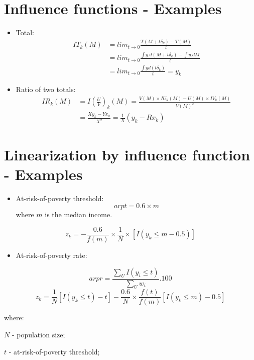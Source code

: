 \documentclass[]{book}
\providecommand{\tightlist}{%
  \setlength{\itemsep}{0pt}\setlength{\parskip}{0pt}}
\begin{document}
\section{Influence functions -
Examples}\label{influence-functions---examples}

\begin{itemize}
\item
  Total: \[
  \begin{aligned}
  IT_k(M)&=lim_{t\rightarrow 0}\frac{T(M+t\delta_k)-T(M)}{t}\\
  &=lim_{t\rightarrow 0}\frac{\int y.d(M+t\delta_k)-\int y.dM}{t}\\
  &=lim_{t\rightarrow 0}\frac{\int yd(t\delta_k)}{t}=y_k  
  \end{aligned}
  \]
\item
  Ratio of two totals: \[
  \begin{aligned}
  IR_k(M)&=I\left(\frac{U}{V}\right)_k(M)=\frac{V(M)\times IU_k(M)-U(M)\times IV_k(M)}{V(M)^2}\\
  &=\frac{X y_k-Y x_k}{X^2}=\frac{1}{X}(y_k-Rx_k)
  \end{aligned}
  \]
\end{itemize}

\section{Linearization by influence function -
Examples}\label{linearization-by-influence-function---examples}

\begin{itemize}
\tightlist
\item
  At-risk-of-poverty threshold: \[
  arpt = 0.6\times m
  \] where \(m\) is the median income.
\end{itemize}

\[
z_k= -\frac{0.6}{f(m)}\times\frac{1}{N}\times\left[I(y_k\leq m-0.5) \right]
\]

\begin{itemize}
\tightlist
\item
  At-risk-of-poverty rate:
\end{itemize}

\[
 arpr=\frac{\sum_U I(y_i \leq t)}{\sum_U w_i}.100
\] \[
z_k=\frac{1}{N}\left[I(y_k\leq t)-t\right]-\frac{0.6}{N}\times\frac{f(t)}{f(m)}\left[I(y_k\leq m)-0.5\right]
\]

where:

\(N\) - population size;

\(t\) - at-risk-of-poverty threshold;
\end{document}
